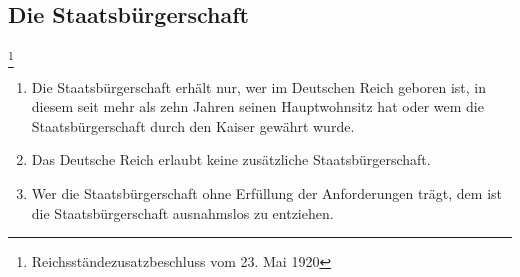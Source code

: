 \documentclass{article}
\begin{document}
\subsection{Die Staatsbürgerschaft}\footnote{Reichsständezusatzbeschluss vom 23. Mai 1920}
\begin{enumerate}[(1)]
    \item Die Staatsbürgerschaft erhält nur, wer im Deutschen Reich geboren ist, in diesem seit mehr als zehn Jahren seinen Hauptwohnsitz hat oder wem die Staatsbürgerschaft durch den Kaiser gewährt wurde.
    \item Das Deutsche Reich erlaubt keine zusätzliche Staatsbürgerschaft.
    \item Wer die Staatsbürgerschaft ohne Erfüllung der Anforderungen trägt, dem ist die Staatsbürgerschaft ausnahmslos zu entziehen.
\end{enumerate}
\end{document}
